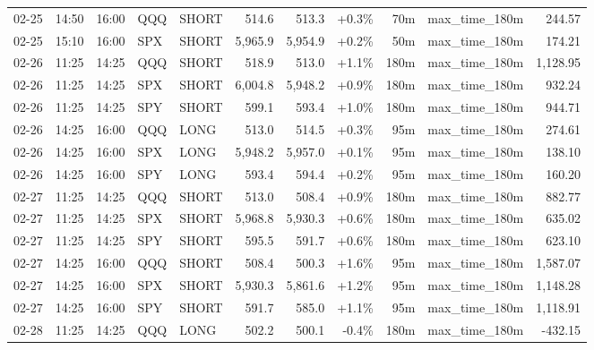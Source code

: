 \documentclass[11pt,a4paper,twoside]{article}
\begin{document}
\begin{center}
\begin{longtable}{>{\color{txtmain}}l l l l l r r r r >{\color{txtmain}}l r}
02-25 & 14:50 & 16:00 & QQQ & SHORT & 514.6 & 513.3 & \textcolor{wingreen}{+0.3\%} & 70m & max\_time\_180m & \textcolor{wingreen}{244.57} \\
02-25 & 15:10 & 16:00 & SPX & SHORT & 5,965.9 & 5,954.9 & \textcolor{wingreen}{+0.2\%} & 50m & max\_time\_180m & \textcolor{wingreen}{174.21} \\
02-26 & 11:25 & 14:25 & QQQ & SHORT & 518.9 & 513.0 & \textcolor{wingreen}{+1.1\%} & 180m & max\_time\_180m & \textcolor{wingreen}{1,128.95} \\
02-26 & 11:25 & 14:25 & SPX & SHORT & 6,004.8 & 5,948.2 & \textcolor{wingreen}{+0.9\%} & 180m & max\_time\_180m & \textcolor{wingreen}{932.24} \\
02-26 & 11:25 & 14:25 & SPY & SHORT & 599.1 & 593.4 & \textcolor{wingreen}{+1.0\%} & 180m & max\_time\_180m & \textcolor{wingreen}{944.71} \\
02-26 & 14:25 & 16:00 & QQQ & LONG & 513.0 & 514.5 & \textcolor{wingreen}{+0.3\%} & 95m & max\_time\_180m & \textcolor{wingreen}{274.61} \\
02-26 & 14:25 & 16:00 & SPX & LONG & 5,948.2 & 5,957.0 & \textcolor{wingreen}{+0.1\%} & 95m & max\_time\_180m & \textcolor{wingreen}{138.10} \\
02-26 & 14:25 & 16:00 & SPY & LONG & 593.4 & 594.4 & \textcolor{wingreen}{+0.2\%} & 95m & max\_time\_180m & \textcolor{wingreen}{160.20} \\
02-27 & 11:25 & 14:25 & QQQ & SHORT & 513.0 & 508.4 & \textcolor{wingreen}{+0.9\%} & 180m & max\_time\_180m & \textcolor{wingreen}{882.77} \\
02-27 & 11:25 & 14:25 & SPX & SHORT & 5,968.8 & 5,930.3 & \textcolor{wingreen}{+0.6\%} & 180m & max\_time\_180m & \textcolor{wingreen}{635.02} \\
02-27 & 11:25 & 14:25 & SPY & SHORT & 595.5 & 591.7 & \textcolor{wingreen}{+0.6\%} & 180m & max\_time\_180m & \textcolor{wingreen}{623.10} \\
02-27 & 14:25 & 16:00 & QQQ & SHORT & 508.4 & 500.3 & \textcolor{wingreen}{+1.6\%} & 95m & max\_time\_180m & \textcolor{wingreen}{1,587.07} \\
02-27 & 14:25 & 16:00 & SPX & SHORT & 5,930.3 & 5,861.6 & \textcolor{wingreen}{+1.2\%} & 95m & max\_time\_180m & \textcolor{wingreen}{1,148.28} \\
02-27 & 14:25 & 16:00 & SPY & SHORT & 591.7 & 585.0 & \textcolor{wingreen}{+1.1\%} & 95m & max\_time\_180m & \textcolor{wingreen}{1,118.91} \\
02-28 & 11:25 & 14:25 & QQQ & LONG & 502.2 & 500.1 & \textcolor{lossred}{-0.4\%} & 180m & max\_time\_180m & \textcolor{lossred}{-432.15} \\

\end{longtable}
\end{center}
\end{document}
